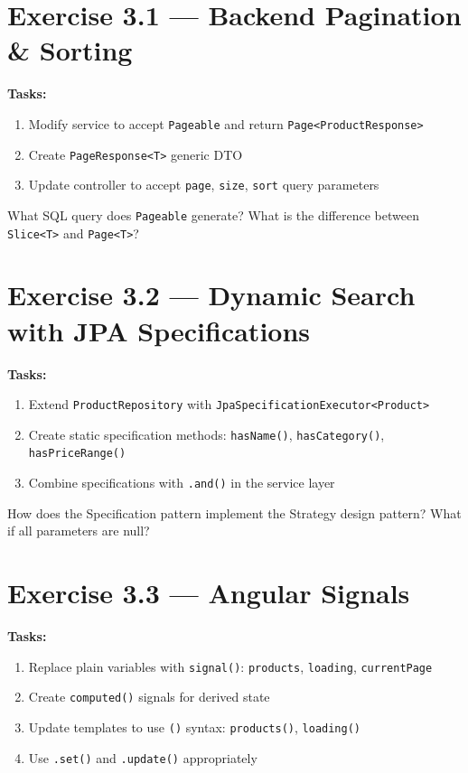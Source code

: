 \documentclass[12pt,a4paper]{report}
\begin{document}
\section{Exercise 3.1 --- Backend Pagination \& Sorting}

\textbf{Tasks:}
\begin{enumerate}
    \item Modify service to accept \texttt{Pageable} and return \texttt{Page<ProductResponse>}
    \item Create \texttt{PageResponse<T>} generic DTO
    \item Update controller to accept \texttt{page}, \texttt{size}, \texttt{sort} query parameters
\end{enumerate}

\begin{thinkbox}
What SQL query does \texttt{Pageable} generate? What is the difference between \texttt{Slice<T>} and \texttt{Page<T>}?
\end{thinkbox}

\section{Exercise 3.2 --- Dynamic Search with JPA Specifications}

\textbf{Tasks:}
\begin{enumerate}
    \item Extend \texttt{ProductRepository} with \texttt{JpaSpecificationExecutor<Product>}
    \item Create static specification methods: \texttt{hasName()}, \texttt{hasCategory()}, \texttt{hasPriceRange()}
    \item Combine specifications with \texttt{.and()} in the service layer
\end{enumerate}

\begin{thinkbox}
How does the Specification pattern implement the Strategy design pattern? What if all parameters are null?
\end{thinkbox}

\section{Exercise 3.3 --- Angular Signals}

\textbf{Tasks:}
\begin{enumerate}
    \item Replace plain variables with \texttt{signal()}: \texttt{products}, \texttt{loading}, \texttt{currentPage}
    \item Create \texttt{computed()} signals for derived state
    \item Update templates to use \texttt{()} syntax: \texttt{products()}, \texttt{loading()}
    \item Use \texttt{.set()} and \texttt{.update()} appropriately
\end{enumerate}
\end{document}
